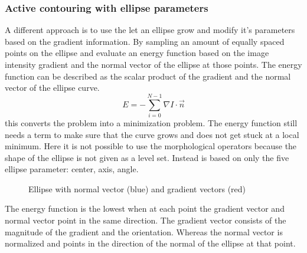 \subsubsection{Active contouring with ellipse parameters}
A different approach is to use the let an ellipse grow and modify it's parameters based on the gradient information. By sampling an amount of equally spaced points on the ellipse and evaluate an energy function based on the image intensity gradient and the normal vector of the ellipse at those points. The energy function can be described as the scalar product of the gradient and the normal vector of the ellipse curve. 
\begin{equation}
    E = -\sum_{i=0}^{N-1} \nabla I \cdot \vec{n}
\end{equation} 
this converts the problem into a minimization problem. The energy function still needs a term to make sure that the curve grows and does not get stuck at a local minimum. Here it is not possible to use the morphological operators because the shape of the ellipse is not given as a level set. Instead is based on only the five ellipse parameter: center, axis, angle. 

\begin{figure}[h]
\centering
{}
\label{fig:normalgradientellipse}
\caption{Ellipse with normal vector (blue) and gradient vectors (red)}

\end{figure}
The energy function is the lowest when at each point the gradient vector and normal vector  point in the same direction. The gradient vector consists of the magnitude of the gradient and the orientation. Whereas the normal vector is normalized and points in the direction of the normal of the ellipse at that point. 

